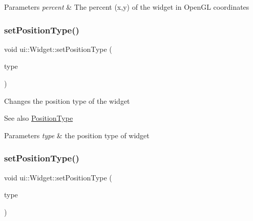 \begin{DoxyParams}{Parameters}
{\em percent} & The percent (x,y) of the widget in Open\+GL coordinates \\
\hline
\end{DoxyParams}
\mbox{\label{classui_1_1Widget_a243b1fe9cb8b404e0c79176a0a36d10d}} 
\subsubsection{\texorpdfstring{set\+Position\+Type()}{setPositionType()}\hspace{0.1cm}{\footnotesize\ttfamily [1/2]}}
{\footnotesize\ttfamily void ui\+::\+Widget\+::set\+Position\+Type (\begin{DoxyParamCaption}\item[{\hyperlink{classui_1_1Widget_acfb8004ec169575dab6d3e8eb3e92b90}{Position\+Type}}]{type }\end{DoxyParamCaption})}

Changes the position type of the widget

\begin{DoxySeeAlso}{See also}
{\ttfamily \hyperlink{classui_1_1Widget_acfb8004ec169575dab6d3e8eb3e92b90}{Position\+Type}}
\end{DoxySeeAlso}

\begin{DoxyParams}{Parameters}
{\em type} & the position type of widget \\
\hline
\end{DoxyParams}
\mbox{\label{classui_1_1Widget_a243b1fe9cb8b404e0c79176a0a36d10d}} 
\subsubsection{\texorpdfstring{set\+Position\+Type()}{setPositionType()}\hspace{0.1cm}{\footnotesize\ttfamily [2/2]}}
{\footnotesize\ttfamily void ui\+::\+Widget\+::set\+Position\+Type (\begin{DoxyParamCaption}\item[{\hyperlink{classui_1_1Widget_acfb8004ec169575dab6d3e8eb3e92b90}{Position\+Type}}]{type }\end{DoxyParamCaption})}

